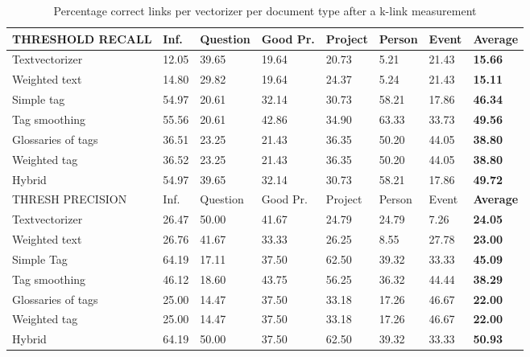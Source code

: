 \begin{table}
\begin{tabular}{| l | l | l | l | l | l | l | l |}
\hline
THRESHOLD RECALL & Inf. &  Question &  Good Pr.& Project & Person &  Event & {\bf Average} \\
\hline
Textvectorizer & 12.05 & 39.65 & 19.64 & 20.73 & 5.21 & 21.43 & {\bf 15.66}\\
Weighted text & 14.80 & 29.82 & 19.64 & 24.37 & 5.24 & 21.43 & {\bf 15.11}\\
Simple tag & 54.97 & 20.61 & 32.14 & 30.73 & 58.21 & 17.86 & {\bf 46.34}\\
Tag smoothing & 55.56 & 20.61 & 42.86 & 34.90 & 63.33 & 33.73 & {\bf 49.56}\\
Glossaries of tags & 36.51 & 23.25 & 21.43 & 36.35 & 50.20 & 44.05 & {\bf 38.80}\\
Weighted tag & 36.52 & 23.25 & 21.43 & 36.35 & 50.20 & 44.05 & {\bf 38.80}\\
Hybrid & 54.97 & 39.65 & 32.14 & 30.73 & 58.21 & 17.86 & {\bf 49.72}\\
\hline

\hline
THRESH PRECISION & Inf. &  Question &  Good Pr.& Project & Person &  Event & {\bf Average} \\
\hline
Textvectorizer & 26.47 & 50.00 & 41.67 & 24.79 & 24.79 & 7.26 & {\bf 24.05}\\
Weighted text & 26.76 & 41.67 & 33.33 & 26.25 & 8.55 & 27.78 & {\bf 23.00}\\
Simple Tag & 64.19 & 17.11 & 37.50 & 62.50 & 39.32 & 33.33 & {\bf 45.09}\\
Tag smoothing & 46.12 & 18.60 & 43.75 & 56.25 & 36.32 & 44.44 & {\bf 38.29}\\
Glossaries of tags & 25.00 & 14.47 & 37.50 & 33.18 & 17.26 & 46.67 & {\bf 22.00}\\
Weighted tag & 25.00 & 14.47 & 37.50 & 33.18 & 17.26 & 46.67 & {\bf 22.00}\\
Hybrid & 64.19 & 50.00 & 37.50 & 62.50 & 39.32 & 33.33 & {\bf 50.93}\\
\hline
\end{tabular}

\caption{Percentage correct links per vectorizer per document type after a k-link measurement}
\label{bayes_table1}
\end{table}

